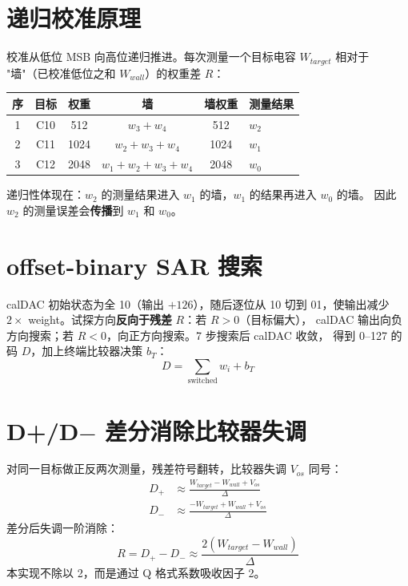 \documentclass[UTF8,a4paper,11pt,twoside]{ctexrep}
\begin{document}
\section{递归校准原理}

校准从低位 MSB 向高位递归推进。每次测量一个目标电容 $W_{target}$ 相对于
"墙"（已校准低位之和 $W_{wall}$）的权重差 $R$：

\begin{table}[ht]\centering\footnotesize
\begin{tabular}{cccccl}
\toprule
\textbf{序} & \textbf{目标} & \textbf{权重} & \textbf{墙} & \textbf{墙权重} & \textbf{测量结果} \\
\hline
1 & C10 & 512 & $w_3+w_4$ & 512 & $w_2$ \\
2 & C11 & 1024 & $w_2+w_3+w_4$ & 1024 & $w_1$ \\
3 & C12 & 2048 & $w_1+w_2+w_3+w_4$ & 2048 & $w_0$ \\
\bottomrule
\end{tabular}
\end{table}

递归性体现在：$w_2$ 的测量结果进入 $w_1$ 的墙，$w_1$ 的结果再进入 $w_0$ 的墙。
因此 $w_2$ 的测量误差会\textbf{传播}到 $w_1$ 和 $w_0$。

\section{offset-binary SAR 搜索}

calDAC 初始状态为全 10（输出 $+126$），随后逐位从 10 切到 01，使输出减少
$2\times$ weight。试探方向\textbf{反向于残差} $R$：若 $R>0$（目标偏大），
calDAC 输出向负方向搜索；若 $R<0$，向正方向搜索。7 步搜索后 calDAC 收敛，
得到 0--127 的码 $D$，加上终端比较器决策 $b_T$：
\[
D = \sum_{\text{switched}} w_i + b_T
\]

\section{D+/D$-$ 差分消除比较器失调}

对同一目标做正反两次测量，残差符号翻转，比较器失调 $V_{os}$ 同号：
\begin{align}
D_+ &\approx \frac{W_{target}-W_{wall}+V_{os}}{\Delta} \\
D_- &\approx \frac{-W_{target}+W_{wall}+V_{os}}{\Delta}
\end{align}
差分后失调一阶消除：
\[
\boxed{R = D_+ - D_- \approx \frac{2(W_{target}-W_{wall})}{\Delta}}
\]
本实现不除以 2，而是通过 Q 格式系数吸收因子 2。
\end{document}
